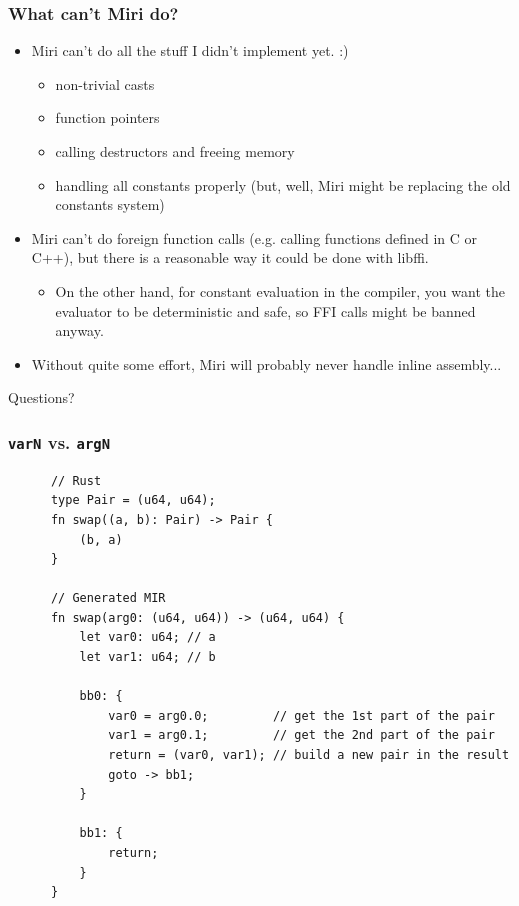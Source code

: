 \documentclass{beamer}
\begin{document}
\begin{frame}
  \frametitle{What can't Miri do?}
  \begin{itemize}
    \item Miri can't do all the stuff I didn't implement yet. :)
      \begin{itemize}
        \item non-trivial casts
        \item function pointers
        \item calling destructors and freeing memory
        \item handling all constants properly (but, well, Miri might be
          replacing the old constants system)
      \end{itemize}

    \item Miri can't do foreign function calls (e.g. calling functions defined
      in C or C++), but there is a reasonable way it could be done with libffi.
      \begin{itemize}
        \item On the other hand, for constant evaluation in the compiler, you
          want the evaluator to be deterministic and safe, so FFI calls might be
          banned anyway.
      \end{itemize}

    \item Without quite some effort, Miri will probably never handle inline
      assembly...
  \end{itemize}
\end{frame}

\begin{frame}
  \begin{center}
    \LARGE{Questions?}
  \end{center}
\end{frame}


\begin{frame}[fragile]
  \frametitle{\texttt{varN} vs. \texttt{argN}}
  \begin{center}
    \begin{verbatim}
      // Rust
      type Pair = (u64, u64);
      fn swap((a, b): Pair) -> Pair {
          (b, a)
      }

      // Generated MIR
      fn swap(arg0: (u64, u64)) -> (u64, u64) {
          let var0: u64; // a
          let var1: u64; // b

          bb0: {
              var0 = arg0.0;         // get the 1st part of the pair
              var1 = arg0.1;         // get the 2nd part of the pair
              return = (var0, var1); // build a new pair in the result
              goto -> bb1;
          }

          bb1: {
              return;
          }
      }
    \end{verbatim}
  \end{center}
\end{frame}
\end{document}
